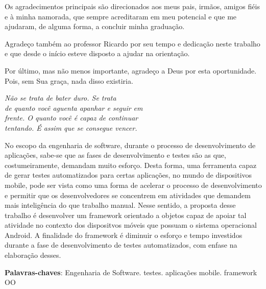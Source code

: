 \documentclass[
    12pt,       %
    openright,      %
    twoside,      %
    a4paper,      %
    english,      %
    french,       %
    spanish,      %
    brazil,       %
    ]{abntex2}
\begin{document}
  \begin{agradecimentos}
  Os agradecimentos principais são direcionados aos meus pais, irmãos,
  amigos fiéis e à minha namorada, que sempre acreditaram em meu potencial
  e que me ajudaram, de alguma forma, a concluir minha graduação.

  Agradeço também ao professor Ricardo por seu tempo e dedicação neste trabalho e que desde o início esteve disposto a ajudar na orientação.

  Por último, mas não menos importante, agradeço a Deus por esta oportunidade. Pois, sem Sua graça, nada disso existiria.

  \end{agradecimentos}

  \begin{epigrafe}
      \vspace*{\fill}
    \begin{flushright}
      \textit{Não se trata de bater duro. Se trata \\
       de quanto você aguenta apanhar e seguir em \\
       frente. O quanto você é capaz de continuar \\
       tentando. É assim que se consegue vencer.}
    \end{flushright}
  \end{epigrafe}


  \begin{resumo}
    No escopo da engenharia de software, durante o processo de desenvolvimento
    de aplicações, sabe-se que as fases de desenvolvimento e testes são as que,
    costumeiramente, demandam muito esforço. Desta forma, uma ferramenta capaz
    de gerar testes automatizados para certas aplicações, no mundo de
    dispositivos mobile, pode ser vista como uma forma de acelerar o processo de
    desenvolvimento e permitir que os desenvolvedores se concentrem em
    atividades que demandem mais inteligência do que trabalho manual. Nesse
    sentido, a proposta desse trabalho é desenvolver um framework orientado
    a objetos capaz de apoiar tal atividade no contexto dos dispositvos móveis
    que possuam o sistema operacional Android. A finalidade do framework é diminuir
    o esforço e tempo investidos durante a fase de desenvolvimento de testes automatizados,
    com enfase na elaboração desses.

   \vspace{\onelineskip}

   \noindent
   \textbf{Palavras-chaves}: Engenharia de Software. testes. aplicações mobile.
   framework OO
  \end{resumo}
\end{document}
